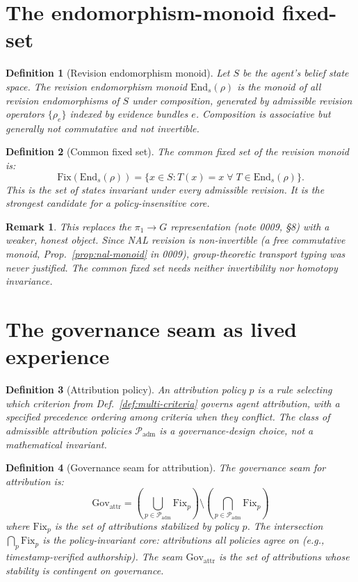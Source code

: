 \documentclass[11pt]{article}
\newtheorem{definition}{Definition}
\newtheorem{remark}{Remark}
\newcommand{\Fix}{\mathrm{Fix}}
\newcommand{\Gov}{\mathrm{Gov}}
\newcommand{\End}{\mathrm{End}}
\begin{document}
\section{The endomorphism-monoid fixed-set}

\begin{definition}[Revision endomorphism monoid]
\label{def:rev-monoid}
Let $S$ be the agent's belief state space. The \emph{revision endomorphism monoid}
$\End_s(\rho)$ is the monoid of all revision endomorphisms of $S$ under composition,
generated by admissible revision operators $\{\rho_e\}$ indexed by evidence bundles $e$.
Composition is associative but generally not commutative and not invertible.
\end{definition}

\begin{definition}[Common fixed set]
\label{def:common-fixed}
The \emph{common fixed set} of the revision monoid is:
\[
  \Fix(\End_s(\rho)) = \{x \in S : T(x) = x \;\forall\; T \in \End_s(\rho)\}.
\]
This is the set of states invariant under every admissible revision. It is the strongest
candidate for a policy-insensitive core.
\end{definition}

\begin{remark}
This replaces the $\pi_1 \to G$ representation (note 0009, \S8) with a weaker, honest
object. Since NAL revision is non-invertible (a free commutative monoid, Prop.~\ref{prop:nal-monoid}
in 0009), group-theoretic transport typing was never justified. The common fixed set needs
neither invertibility nor homotopy invariance.
\end{remark}

\section{The governance seam as lived experience}

\begin{definition}[Attribution policy]
\label{def:attribution-policy}
An \emph{attribution policy} $p$ is a rule selecting which criterion from
Def.~\ref{def:multi-criteria} governs agent attribution, with a specified precedence
ordering among criteria when they conflict. The class of admissible attribution policies
$\mathcal{P}_{\mathrm{adm}}$ is a governance-design choice, not a mathematical invariant.
\end{definition}

\begin{definition}[Governance seam for attribution]
\label{def:gov-attribution}
The governance seam for attribution is:
\[
  \Gov_{\mathrm{attr}} = \left(\bigcup_{p \in \mathcal{P}_{\mathrm{adm}}} \Fix_p\right)
  \setminus \left(\bigcap_{p \in \mathcal{P}_{\mathrm{adm}}} \Fix_p\right)
\]
where $\Fix_p$ is the set of attributions stabilized by policy $p$. The intersection
$\bigcap_p \Fix_p$ is the \emph{policy-invariant core}: attributions all policies agree on
(e.g., timestamp-verified authorship). The seam $\Gov_{\mathrm{attr}}$ is the set of
attributions whose stability is \emph{contingent on governance}.
\end{definition}
\end{document}
